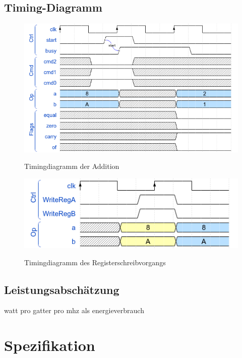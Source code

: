 \documentclass[11pt]{report}
\begin{document}
	\section{Timing-Diagramm}
	\begin{figure}[htbp]
		\begin{center}
			\includegraphics[width=\textwidth]{native_timing}
			\label{native_timing}
			\caption{Timingdiagramm der Addition}\label{native_timing}
		\end{center}
	\end{figure}
	\FloatBarrier
	\begin{figure}[htbp]
		\begin{center}
			\includegraphics[width=\textwidth]{write_reg_timing}
			\label{write_reg_timing}
			\caption{Timingdiagramm des Registerschreibvorgangs}\label{write_reg_timing}
		\end{center}
	\end{figure}
	\FloatBarrier
	
	\section{Leistungsabschätzung}
	watt pro gatter pro mhz als energieverbrauch
	
	
	\chapter{Spezifikation}
	
\end{document}

